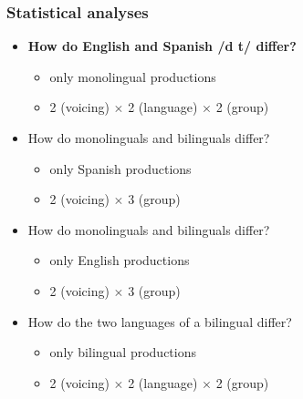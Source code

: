 \documentclass{beamer}
\begin{document}
\begin{frame}
\frametitle{Statistical analyses}
\begin{itemize}
	\item \textbf{How do English and Spanish /d t/ differ?}
	\begin{itemize}
		\item only monolingual productions
		\item 2 (voicing) $\times$ 2 (language) $\times$ 2 (group)
	\end{itemize}
	\item How do monolinguals and bilinguals differ?
	\begin{itemize}
		\item only Spanish productions
		\item 2 (voicing) $\times$ 3 (group)
	\end{itemize}
	\item How do monolinguals and bilinguals differ?
	\begin{itemize}
		\item only English productions
		\item 2 (voicing) $\times$ 3 (group)
	\end{itemize}
	\item How do the two languages of a bilingual differ?
	\begin{itemize}
		\item only bilingual productions
		\item 2 (voicing) $\times$ 2 (language) $\times$ 2 (group)
	\end{itemize}
\end{itemize}
\end{frame}
\end{document}
